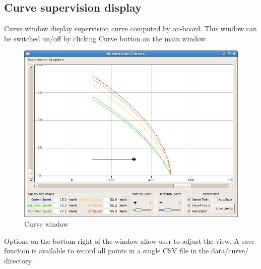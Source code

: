 \subsection{Curve supervision display}
Curve window display supervision curve computed by on-board. This window can be switched on/off by clicking Curve button on the main window.
\newline
\begin{figure}[h]
  \centering
  \includegraphics[width=\textwidth]{image/test_runner_supervision_curves.jpg}
  \caption{Curve window}
  \label{fig:Curve window}
\end{figure}
Options on the bottom right of the window allow user to adjust the view.
A save function is available to record all points in a single CSV file in the data/curve/ directory.
\newpage
